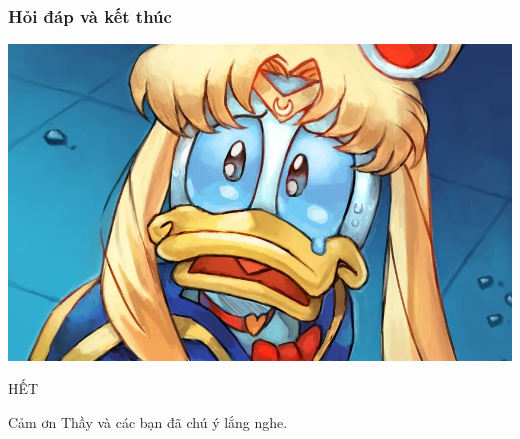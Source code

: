 \documentclass{beamer}
\begin{document}
\begin{frame}
    \frametitle{Hỏi đáp và kết thúc}
    \includegraphics[width=\textwidth]{images/ask_and_answer.jpg}
\end{frame}

\begin{frame}
    \Huge{\centerline{HẾT}}
    \Large{\centerline{Cảm ơn Thầy và các bạn đã chú ý lắng nghe.}}
\end{frame}

\end{document}
